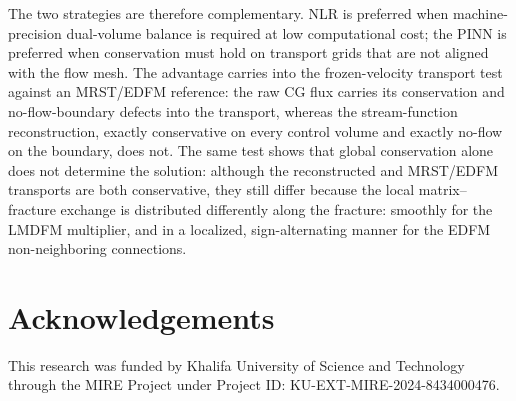 \documentclass[a4paper,fleqn]{cas-sc}
\begin{document}
The two strategies are therefore complementary. NLR is preferred when
machine-precision dual-volume balance is required at low computational cost; the
PINN is preferred when conservation must hold on transport grids that are not
aligned with the flow mesh. The advantage carries into the frozen-velocity
transport test against an MRST/EDFM reference: the raw CG flux carries its
conservation and no-flow-boundary defects into the transport, whereas the
stream-function reconstruction, exactly conservative on every control volume and
exactly no-flow on the boundary, does not. The same test shows that global
conservation alone
does not determine the solution: although the reconstructed and MRST/EDFM transports
are both conservative, they still differ because the local matrix--fracture
exchange is distributed differently along the fracture: smoothly for the LMDFM
multiplier, and in a localized, sign-alternating manner for the EDFM
non-neighboring connections.

\section*{Acknowledgements}

This research was funded by Khalifa University of Science and Technology through
the MIRE Project under Project ID: KU-EXT-MIRE-2024-8434000476.



\end{document}
